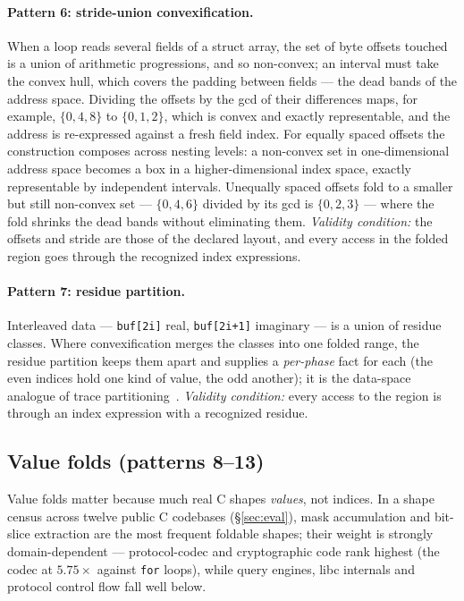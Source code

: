 \documentclass[11pt,a4paper]{article}
\begin{document}
\paragraph{Pattern 6: stride-union convexification.}
\label{sec:convex}
When a loop reads several fields of a struct array, the set of byte offsets touched is a
union of arithmetic progressions, and so non-convex; an interval must take the convex
hull, which covers the padding between fields --- the dead bands of the address space.
Dividing the offsets by the gcd of their differences maps, for example, $\{0,4,8\}$ to
$\{0,1,2\}$, which is convex and exactly representable, and the address is re-expressed
against a fresh field index. For equally spaced offsets the construction composes across
nesting levels: a non-convex set in one-dimensional address space becomes a box in a
higher-dimensional index space, exactly representable by independent intervals. Unequally
spaced offsets fold to a smaller but still non-convex set --- $\{0,4,6\}$ divided by its
gcd is $\{0,2,3\}$ --- where the fold shrinks the dead bands without eliminating them. \emph{Validity condition:}
the offsets and stride are those of the declared layout, and every access in the folded
region goes through the recognized index expressions.

\paragraph{Pattern 7: residue partition.} Interleaved data --- \texttt{buf[2i]} real,
\texttt{buf[2i+1]} imaginary --- is a union of residue classes. Where convexification
merges the classes into one folded range, the residue partition keeps them apart and
supplies a \emph{per-phase} fact for each (the even indices hold one kind of value, the
odd another); it is the data-space analogue of trace partitioning~\cite{rival2007}.
\emph{Validity condition:} every access to the region is through an index expression
with a recognized residue.

\subsection{Value folds (patterns 8--13)}

Value folds matter because much real C shapes \emph{values}, not indices. In a shape
census across twelve public C codebases (\S\ref{sec:eval}), mask accumulation and
bit-slice extraction are the most frequent foldable shapes; their weight is strongly
domain-dependent --- protocol-codec and cryptographic code rank highest (the codec at
$5.75\times$ against \texttt{for} loops), while query engines, libc internals and
protocol control flow fall well below.
\end{document}
